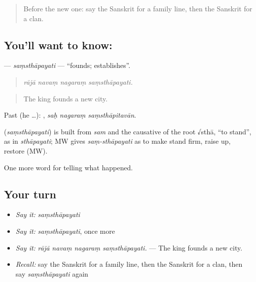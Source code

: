 \label{lesson:SA-C322-samsthapayati}



\begin{quote}
Before the new one: say the Sanskrit for a family line, then the Sanskrit for a clan.
\end{quote}

\subsection*{You'll want to know: }
\textbf{} — \emph{saṃsthāpayati} — \textquotedblleft{}founds; establishes\textquotedblright{}.

\begin{quote}
   
\end{quote}

\begin{quote}
\emph{rājā navaṃ nagaraṃ saṃsthāpayati.}
\end{quote}

\begin{quote}
The king founds a new city.
\end{quote}

Past (he …):   , \emph{saḥ nagaraṃ saṃsthāpitavān}.

\begin{cousinweb}
\textbf{} (\emph{saṃsthāpayati}) is built from \emph{sam} and the causative of the root √sthā, \textquotedblleft{}to stand\textquotedblright{}, as in \emph{sthāpayati}; MW gives \emph{saṃ-sthāpayati} as to make stand firm, raise up, restore (MW).
\end{cousinweb}

\begin{grammarlens}[title={What you've built}]
One more word for telling what happened.
\end{grammarlens}

\subsection*{Your turn}
\begin{itemize}
\raggedright
  \item \emph{Say it:} \emph{saṃsthāpayati}
  \item \emph{Say it:} \emph{saṃsthāpayati}, once more
  \item \emph{Say it:} \emph{rājā navaṃ nagaraṃ saṃsthāpayati.} — The king founds a new city.
  \item \emph{Recall:} say the Sanskrit for a family line, then the Sanskrit for a clan, then say \emph{saṃsthāpayati} again
\end{itemize}

